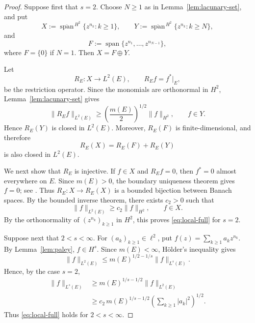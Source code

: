 \documentclass[10pt,a4paper]{amsart}
\begin{document}
\begin{proof}
Suppose first that \(s=2\).  Choose \(N\ge1\) as in
Lemma~\ref{lem:lacunary-set}, and put
\[
        X
        :=
        \overline{\operatorname{span}}^{\,H^2}
        \{z^{n_k}:k\ge1\},
        \qquad
        Y
        :=
        \overline{\operatorname{span}}^{\,H^2}
        \{z^{n_k}:k\ge N\},
\]
and
\[
        F
        :=
        \operatorname{span}
        \{z^{n_1},\ldots,z^{n_{N-1}}\},
\]
where \(F=\{0\}\) if \(N=1\). Then
\(
        X=F\oplus Y.
\)

Let
\[
        R_E:X\longrightarrow L^2(E),
        \qquad
        R_Ef=f^*|_E,
\]
be the restriction operator. Since the monomials are orthonormal in
\(H^2\), Lemma~\ref{lem:lacunary-set} gives
\[
        \|R_Ef\|_{L^2(E)}
        \ge
        \left(\frac{m(E)}{2}\right)^{1/2}
        \|f\|_{H^2},
        \qquad
        f\in Y.
\]
Hence \(R_E(Y)\) is closed in \(L^2(E)\). Moreover, \(R_E(F)\) is
finite-dimensional, and therefore
\[
        R_E(X)
        =
        R_E(F)+R_E(Y)
\]
is also closed in \(L^2(E)\).

We next show that \(R_E\) is injective. If \(f\in X\) and \(R_Ef=0\),
then \(f^*=0\) almost everywhere on \(E\). Since \(m(E)>0\), the
boundary uniqueness theorem gives \(f=0\); see
\cite[Ch.~II, Theorem~2.2]{Duren1970}. Thus
\(
        R_E:X\longrightarrow R_E(X)
\)
is a bounded bijection between Banach spaces. By the bounded inverse
theorem, there exists \(c_2>0\) such that
\[
        \|f\|_{L^2(E)}
        \ge
        c_2\|f\|_{H^2},
        \qquad
        f\in X.
\]
By the orthonormality of \((z^{n_k})_{k\ge1}\) in \(H^2\), this proves
\eqref{eq:local-full} for \(s=2\).

Suppose next that \(2<s<\infty\). For
\((a_k)_{k\ge1}\in\ell^2\), put
\(
        f(z)=\sum_{k\ge1}a_kz^{n_k}.
\)
By Lemma~\ref{lem:paley}, \(f\in H^s\). Since \(m(E)<\infty\),
H\"older's inequality gives
\[
        \|f\|_{L^2(E)}
        \le
        m(E)^{1/2-1/s}\|f\|_{L^s(E)}.
\]
Hence, by the case \(s=2\),
\[
\begin{aligned}
        \|f\|_{L^s(E)}
        &\ge
        m(E)^{1/s-1/2}\|f\|_{L^2(E)}\\
        &\ge
        c_2\,m(E)^{1/s-1/2}
        \left(\sum_{k\ge1}|a_k|^2\right)^{1/2}.
\end{aligned}
\]
Thus \eqref{eq:local-full} holds for \(2<s<\infty\).


\end{proof}
\end{document}
